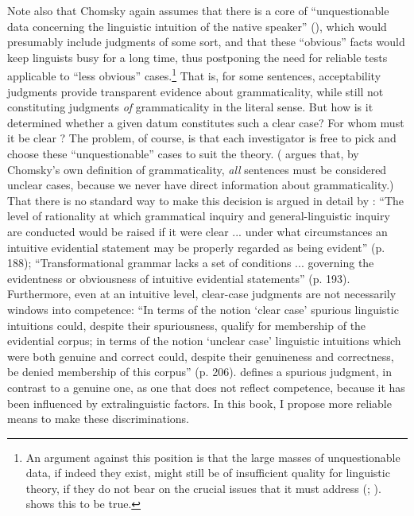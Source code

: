Note also that Chomsky again assumes that there is a core of ``unquestionable data concerning the linguistic intuition of the native speaker'' (), which would presumably include judgments of some sort, and that these ``obvious'' facts would keep linguists busy for a long time, thus postponing the need for reliable tests applicable to ``less obvious'' cases.\footnote{An argument against this position is that the large masses of unquestionable data, if indeed they exist, might still be of insufficient quality for linguistic theory, if they do not bear on the crucial issues that it must address (\citealt{Botha1973}; \citealt{Labov1972a}).  shows this to be true.}
 That is, for some sentences, acceptability judgments provide transparent evidence about grammaticality, while still not constituting judgments  \textit{of} grammaticality in the literal sense. But how is it determined whether a given datum constitutes such a clear case? For whom must it be clear \citep{Ringen1979}? The problem, of course, is that each investigator is free to pick and choose these ``unquestionable'' cases to suit the theory. (\citet{McCawley1976}
 argues that, by Chomsky's own definition of grammaticality, \textit{all} sentences must be considered unclear cases, because we never have direct information about grammaticality.) That there is no standard way to make this decision is argued in detail by \citet{Botha1973}: ``The level of rationality at which grammatical inquiry and general-linguistic inquiry are conducted would be raised if it were clear ... under what circumstances an intuitive evidential statement may be properly regarded as being evident'' (p. 188); ``Transformational grammar lacks a set of conditions ... governing the evidentness or obviousness of intuitive evidential statements'' (p. 193). Furthermore, even at an intuitive level, clear-case judgments are not necessarily windows into competence: ``In terms of the notion `clear case' spurious linguistic intuitions could, despite their spuriousness, qualify for membership of the evidential corpus; in terms of the notion `unclear case' linguistic intuitions which were both genuine and correct could, despite their genuineness and correctness, be denied membership of this corpus'' (p. 206). \citet{Botha1981} defines a spurious judgment, in contrast to a genuine one, as one that does not reflect competence, because it has been influenced by extralinguistic factors. In this book, I propose more reliable means to make these discriminations.


